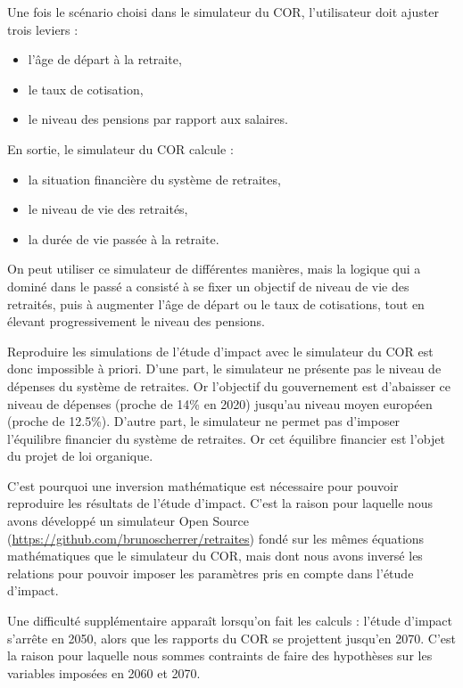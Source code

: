 \documentclass[10pt]{article}
\begin{document}
Une fois le scénario choisi dans le simulateur du COR, 
l'utilisateur doit ajuster trois leviers : 
\begin{itemize}
\item l'âge de départ à la retraite, 
\item le taux de cotisation, 
\item le niveau des pensions par rapport aux salaires. 
\end{itemize}

En sortie, le simulateur du COR calcule :
\begin{itemize}
\item la situation financière du système de retraites, 
\item le niveau de vie des retraités, 
\item la durée de vie passée à la retraite. 
\end{itemize}

On peut utiliser ce simulateur de différentes manières, mais la 
logique qui a dominé dans le passé a consisté à se fixer un objectif 
de niveau de vie des retraités, puis à augmenter l'âge de départ ou 
le taux de cotisations, tout en élevant progressivement le niveau des pensions. 

Reproduire les simulations de l'étude d'impact avec le simulateur du COR 
est donc impossible à priori. 
D'une part, le simulateur ne présente pas le niveau de dépenses du système 
de retraites. 
Or l'objectif du gouvernement est d'abaisser ce niveau de dépenses 
(proche de 14\% en 2020) jusqu'au niveau moyen européen (proche de 12.5\%). 
D'autre part, le simulateur ne permet pas d'imposer l'équilibre financier du système 
de retraites. 
Or cet équilibre financier est l'objet du projet de loi organique. 

C'est pourquoi une inversion mathématique est nécessaire pour pouvoir reproduire 
les résultats de l'étude d'impact. 
C'est la raison pour laquelle nous avons développé un simulateur Open Source 
(\url{https://github.com/brunoscherrer/retraites}) fondé sur les mêmes équations mathématiques 
que le simulateur du COR, mais dont nous avons inversé les relations pour 
pouvoir imposer les paramètres pris en compte dans l'étude d'impact. 

Une difficulté supplémentaire apparaît lorsqu'on fait les calculs : 
l'étude d'impact s'arrête en 2050, alors que les rapports du COR 
se projettent jusqu'en 2070. 
C'est la raison pour laquelle nous sommes contraints de faire des 
hypothèses sur les variables imposées en 2060 et 2070. 
\end{document}
